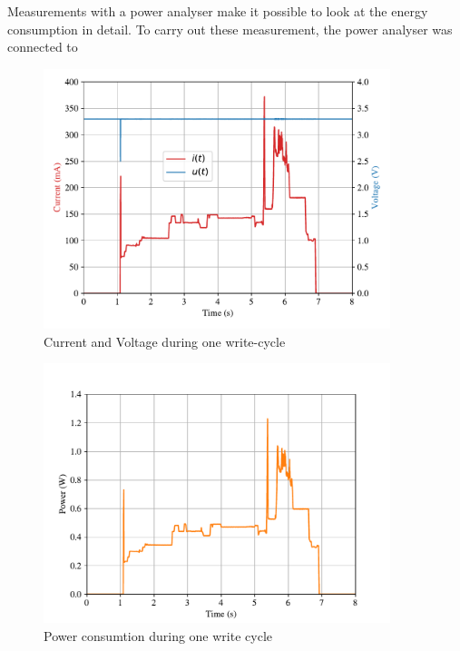 Measurements with a power analyser make it possible to look at the energy consumption in detail.
To carry out these measurement, the power analyser was connected to 

\begin{figure}[ht]
	\centering
	\includegraphics[width=0.9\textwidth]{5-results/energy/logger/ui.pdf}
	\caption{Current and Voltage during one write-cycle\label{results:ui}}
\end{figure}

\begin{figure}[ht]
	\centering
	\includegraphics[width=0.9\textwidth]{5-results/energy/logger/p.pdf}
	\caption{Power consumtion during one write cycle\label{results:p}}
\end{figure}